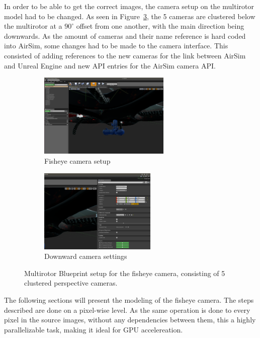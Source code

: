 In order to be able to get the correct images, the camera setup on the multirotor model had to be changed. As seen in Figure~\ref{fig:new_Blueprint_multirotor}, the 5 cameras are clustered below the multirotor at a $90^\circ$ offset from one another, with the main direction being downwards. As the amount of cameras and their name reference is hard coded into AirSim, some changes had to be made to the camera interface. This consisted of adding references to the new cameras for the link between AirSim and Unreal Engine and new API entries for the AirSim camera API.

\begin{figure}[!htb]
    \centering
    \begin{subfigure}{0.45\linewidth}
        \centering
        \includegraphics[height=4cm]{rapport/fig/Simulator/camera_setup.png}
        \caption{Fisheye camera setup}
        \label{fig:new_Blueprint_cameras}
    \end{subfigure}
    \begin{subfigure}{0.45\linewidth}
        \centering
        \includegraphics[height=4cm]{rapport/fig/Simulator/camera_setting.png}
        \caption{Downward camera settings}
        \label{fig:new_Blueprint_nodes}
    \end{subfigure}
    \caption{Multirotor Blueprint setup for the fisheye camera, consisting of 5 clustered perspective cameras.}
    \label{fig:new_Blueprint_multirotor}
\end{figure}

The following sections will present the modeling of the fisheye camera. The steps described are done on a pixel-wise level. As the same operation is done to every pixel in the source images, without any dependencies between them, this a highly parallelizable task, making it ideal for GPU accelereation.

